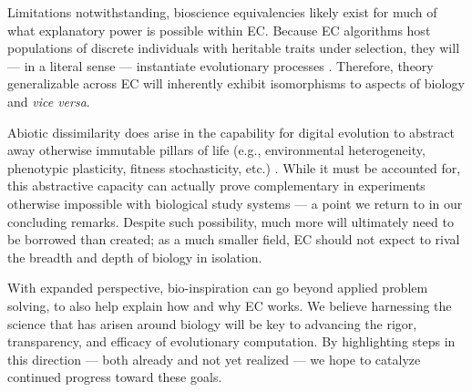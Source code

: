 Limitations notwithstanding, bioscience equivalencies likely exist for much of what explanatory power is possible within EC.
Because EC algorithms host populations of discrete individuals with heritable traits under selection, they will --- in a literal sense --- instantiate evolutionary processes \citep{pennock2007models,lewontin1970units}.
Therefore, theory generalizable across EC will inherently exhibit isomorphisms to aspects of biology and \textit{vice versa}.

Abiotic dissimilarity does arise in the capability for digital evolution to abstract away otherwise immutable pillars of life (e.g., environmental heterogeneity, phenotypic plasticity, fitness stochasticity, etc.) \citep{belew1996computation}.
While it must be accounted for, this abstractive capacity can actually prove complementary in experiments otherwise impossible with biological study systems \citep{dolson2021digital} --- a point we return to in our concluding remarks.
Despite such possibility, much more will ultimately need to be borrowed than created; as a much smaller field, EC should not expect to rival the breadth and depth of biology in isolation.

With expanded perspective, bio-inspiration can go beyond applied problem solving, to also help explain how and why EC works.
We believe harnessing the science that has arisen around biology will be key to advancing the rigor, transparency, and efficacy of evolutionary computation.
By highlighting steps in this direction --- both already and not yet realized --- we hope to catalyze continued progress toward these goals.
